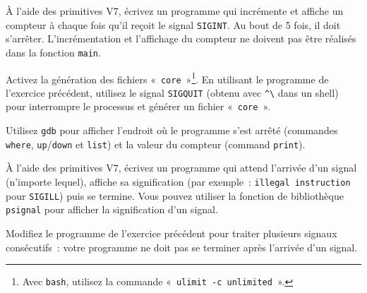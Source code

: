 %


% 


\question

À l'aide des primitives V7, écrivez un programme qui incrémente
et affiche un compteur à chaque fois qu'il reçoit le signal \texttt
{SIGINT}. Au bout de 5 fois, il doit s'arrêter. L'incrémentation et
l'affichage du compteur ne doivent pas être réalisés dans la fonction
\texttt {main}.


\question

Activez la génération des fichiers «~\texttt {core}~»\footnote
{Avec \texttt {bash}, utilisez la commande «~\texttt {ulimit -c
unlimited}~».}.  En utilisant le programme de l'exercice
précédent, utilisez le signal \texttt {SIGQUIT} (obtenu avec \texttt
{\^{}\textbackslash} dans un shell) pour interrompre le processus et
générer un fichier «~\texttt {core}~».

Utilisez \texttt {gdb} pour afficher l'endroit où le programme s'est
arrêté (commandes \texttt {where}, \texttt {up}/\texttt {down} et
\texttt {list}) et la valeur du compteur (command \texttt {print}).


\question

À l'aide des primitives V7, écrivez un programme qui attend l'arrivée
d'un signal (n'importe lequel), affiche sa signification (par
exemple~:  {\tt illegal instruction} pour {\tt SIGILL}) puis se
termine. Vous pouvez utiliser la fonction de bibliothèque \texttt
{psignal} pour afficher la signification d'un signal.


\question

Modifiez le programme de l'exercice précédent pour traiter plusieurs
signaux consécutifs~: votre programme ne doit pas se terminer après
l'arrivée d'un signal.


